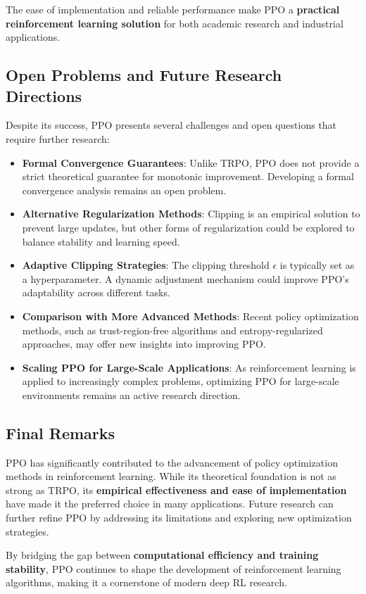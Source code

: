 \documentclass[12pt]{extreport} %
\begin{document}
The ease of implementation and reliable performance make PPO a \textbf{practical reinforcement learning solution} for both academic research and industrial applications.

\subsection{\textbf{Open Problems and Future Research Directions}}

Despite its success, PPO presents several challenges and open questions that require further research:

\begin{itemize}
    \item \textbf{Formal Convergence Guarantees}: Unlike TRPO, PPO does not provide a strict theoretical guarantee for monotonic improvement. Developing a formal convergence analysis remains an open problem.
    \item \textbf{Alternative Regularization Methods}: Clipping is an empirical solution to prevent large updates, but other forms of regularization could be explored to balance stability and learning speed.
    \item \textbf{Adaptive Clipping Strategies}: The clipping threshold \( \epsilon \) is typically set as a hyperparameter. A dynamic adjustment mechanism could improve PPO's adaptability across different tasks.
    \item \textbf{Comparison with More Advanced Methods}: Recent policy optimization methods, such as trust-region-free algorithms and entropy-regularized approaches, may offer new insights into improving PPO.
    \item \textbf{Scaling PPO for Large-Scale Applications}: As reinforcement learning is applied to increasingly complex problems, optimizing PPO for large-scale environments remains an active research direction.
\end{itemize}

\subsection{\textbf{Final Remarks}}

PPO has significantly contributed to the advancement of policy optimization methods in reinforcement learning. While its theoretical foundation is not as strong as TRPO, its \textbf{empirical effectiveness and ease of implementation} have made it the preferred choice in many applications. Future research can further refine PPO by addressing its limitations and exploring new optimization strategies.

By bridging the gap between \textbf{computational efficiency and training stability}, PPO continues to shape the development of reinforcement learning algorithms, making it a cornerstone of modern deep RL research.


\end{document}
